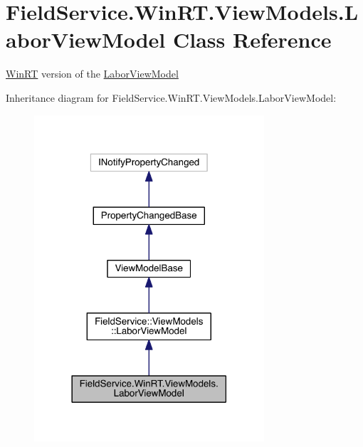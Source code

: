 \hypertarget{class_field_service_1_1_win_r_t_1_1_view_models_1_1_labor_view_model}{\section{Field\+Service.\+Win\+R\+T.\+View\+Models.\+Labor\+View\+Model Class Reference}
\label{class_field_service_1_1_win_r_t_1_1_view_models_1_1_labor_view_model}
}


\hyperlink{namespace_field_service_1_1_win_r_t}{Win\+R\+T} version of the \hyperlink{class_field_service_1_1_win_r_t_1_1_view_models_1_1_labor_view_model}{Labor\+View\+Model}  




Inheritance diagram for Field\+Service.\+Win\+R\+T.\+View\+Models.\+Labor\+View\+Model\+:
\nopagebreak
\begin{figure}[H]
\begin{center}
\leavevmode
\includegraphics[width=242pt]{class_field_service_1_1_win_r_t_1_1_view_models_1_1_labor_view_model__inherit__graph}
\end{center}
\end{figure}


